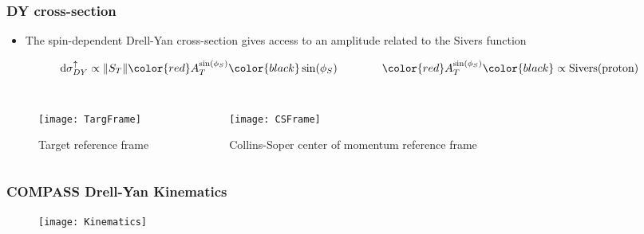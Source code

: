 \begin{frame}
  \frametitle{DY cross-section}

  \begin{itemize}
  \item The spin-dependent Drell-Yan cross-section gives access to an
    amplitude related to the Sivers function
  \end{itemize}
  \begin{equation*}
    \mathrm{d}\sigma_{DY}^{\uparrow} \propto \|S_T \|
    \color{red}A_T^{\sin(\phi_S)}\color{black}\sin(\phi_S) \qquad
    \qquad \color{red}A_T^{\sin(\phi_S)} \color{black} \propto
    \text{Sivers(proton)}
  \end{equation*}

  \begin{columns}
    \begin{figure}
      \centering
      \texttt{[image: TargFrame]}
      \caption{Target reference frame}
    \end{figure}
    \begin{figure}
      \centering
      \texttt{[image: CSFrame]}
      \caption{Collins-Soper center of momentum reference frame}
    \end{figure}
  \end{columns}
\end{frame}


\begin{frame}
  \frametitle{COMPASS Drell-Yan Kinematics}

  \begin{figure}
    \centering
    \texttt{[image: Kinematics]}
  \end{figure}
\end{frame}
